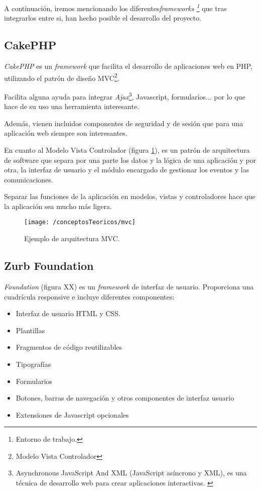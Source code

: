 A continuación, iremos mencionando los diferentes\textit{frameworks \footnote{Entorno de trabajo.}} que tras integrarlos entre si, han hecho posible el desarrollo del proyecto.

\subsection{CakePHP}

\textit{CakePHP}\cite{web:cakephp} es un \textit{framework} que facilita el desarrollo de aplicaciones web en PHP, utilizando el patrón de diseño MVC\footnote{Modelo Vista Controlador}. \cite{wiki:cakephp}

Facilita alguna ayuda para integrar \textit{Ajax}\footnote{Asynchronous JavaScript And XML (JavaScript asíncrono y XML), es una técnica de desarrollo web para crear aplicaciones interactivas. \cite{wiki:ajax}}, Javascript, formularios... por lo que hace de su uso una herramienta interesante.

Además, vienen incluidos componentes de seguridad y de sesión que para una aplicación web siempre son interesantes.

En cuanto al Modelo Vista Controlador (figura \ref{fig:mvc}), es un patrón de arquitectura de software que separa por una parte los datos y la lógica de una aplicación y por otra, la interfaz de usuario y el módulo encargado de gestionar los eventos y las comunicaciones. 

Separar las funciones de la aplicación en modelos, vistas y controladores hace que la aplicación sea mucho más ligera.

\begin{figure}[ht]
	\centering
	\texttt{[image: /conceptosTeoricos/mvc]}
	\caption{Ejemplo de arquitectura MVC.}
	\label{fig:mvc}
\end{figure}

\subsection{Zurb Foundation}

\textit{Foundation\cite{web:foundation}} (figura XX) es un \textit{framework} de interfaz de usuario. Proporciona una cuadrícula responsive e incluye diferentes componentes:
\begin{itemize}
	\item Interfaz de usuario HTML y CSS.
	\item Plantillas
	\item Fragmentos de código reutilizables
	\item Tipografías
	\item Formularios
	\item Botones, barras de navegación y otros componentes de interfaz usuario
	\item Extensiones de Javascript opcionales
\end{itemize}

